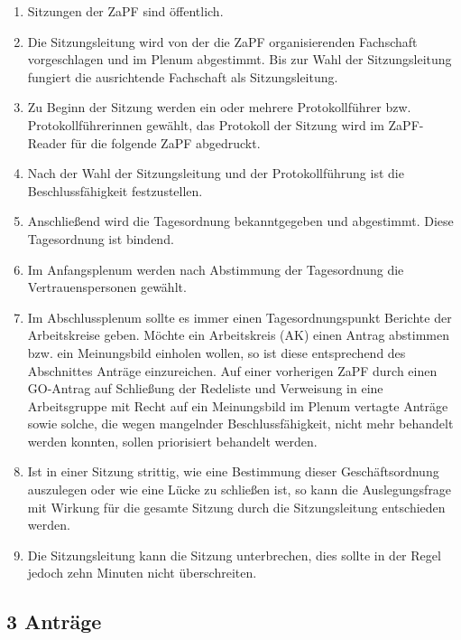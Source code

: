 \begin{enumerate}
\item Sitzungen der ZaPF sind öffentlich.

\item Die Sitzungsleitung wird von der die ZaPF organisierenden Fachschaft
vorgeschlagen und im Plenum abgestimmt.
Bis zur Wahl der Sitzungsleitung fungiert die ausrichtende Fachschaft als
Sitzungsleitung.

\item Zu Beginn der Sitzung werden ein oder mehrere Protokollführer bzw.
Protokollführerinnen gewählt, das Protokoll der Sitzung wird im
ZaPF-Reader für die folgende ZaPF abgedruckt.

\item Nach der Wahl der Sitzungsleitung und der Protokollführung ist die
Beschlussfähigkeit festzustellen.

\item Anschließend wird die Tagesordnung bekanntgegeben und abgestimmt.
Diese Tagesordnung ist bindend.

\item Im Anfangsplenum werden nach Abstimmung der Tagesordnung die
Vertrauenspersonen gewählt.

\item Im Abschlussplenum sollte es immer einen Tagesordnungspunkt \textquotedbl{}Berichte
der Arbeitskreise\textquotedbl{} geben.
Möchte ein Arbeitskreis (AK) einen Antrag abstimmen bzw. ein Meinungsbild
einholen wollen, so ist diese entsprechend des Abschnittes \textquotedbl{}Anträge\textquotedbl{}
einzureichen.
Auf einer vorherigen ZaPF durch einen GO-Antrag auf \textquotedbl{}Schließung der Redeliste
und Verweisung in eine Arbeitsgruppe mit Recht auf ein Meinungsbild im
Plenum\textquotedbl{} vertagte Anträge sowie solche, die wegen mangelnder
Beschlussfähigkeit, nicht mehr behandelt werden konnten, sollen priorisiert
behandelt werden.

\item Ist in einer Sitzung strittig, wie eine Bestimmung dieser Geschäftsordnung
auszulegen oder wie eine Lücke zu schließen ist, so kann die Auslegungsfrage
mit Wirkung für die gesamte Sitzung durch die Sitzungsleitung entschieden
werden.

\item Die Sitzungsleitung kann die Sitzung unterbrechen, dies sollte in der
Regel jedoch zehn Minuten nicht überschreiten.
\end{enumerate}


\subsection*{3 Anträge%
  \label{antrage}%
}


